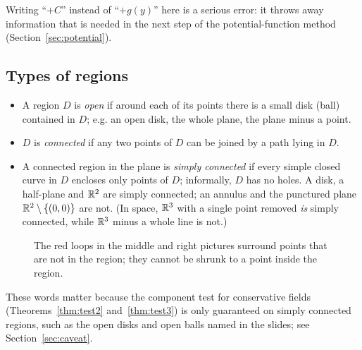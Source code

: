 \begin{warning}
Writing ``$+C$'' instead of ``$+g(y)$'' here is a serious error: it throws
away information that is needed in the next step of the potential-function
method (Section~\ref{sec:potential}).
\end{warning}

\subsection{Types of regions}

\begin{itemize}
  \item A region $D$ is \emph{open} if around each of its points there is a
        small disk (ball) contained in $D$; e.g. an open disk, the whole plane,
        the plane minus a point.
  \item $D$ is \emph{connected} if any two points of $D$ can be joined by a
        path lying in $D$.
  \item A connected region in the plane is \emph{simply connected} if every
        simple closed curve in $D$ encloses only points of $D$; informally,
        $D$ has no holes. A disk, a half-plane and $\mathbb{R}^2$ are simply connected;
        an annulus and the punctured plane $\mathbb{R}^2\setminus\{(0,0)\}$ are not.
        (In space, $\mathbb{R}^3$ with a single point removed \emph{is} simply
        connected, while $\mathbb{R}^3$ minus a whole line is not.)
\end{itemize}

\begin{figure}[H]
\centering
{}
\caption{The red loops in the middle and right pictures surround points that
are not in the region; they cannot be shrunk to a point inside the region.}
\label{fig:regions}
\end{figure}

These words matter because the component test for conservative fields
(Theorems~\ref{thm:test2} and~\ref{thm:test3}) is only guaranteed on
simply connected regions, such as the open disks and open balls named in the
slides; see Section~\ref{sec:caveat}.
